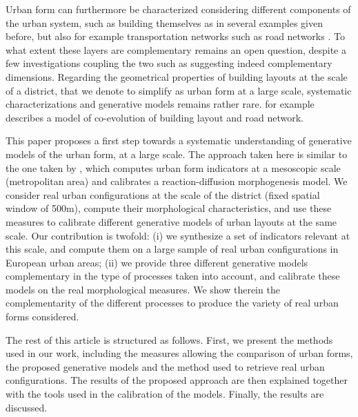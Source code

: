 \documentclass[letterpaper]{article}
\begin{document}


Urban form can furthermore be characterized considering different components of the urban system, such as building themselves as in several examples given before, but also for example transportation networks such as road networks \citep{ye2014quantitative}. To what extent these layers are complementary remains an open question, despite a few investigations coupling the two such as \cite{raimbault2018urban} suggesting indeed complementary dimensions. Regarding the geometrical properties of building layouts at the scale of a district, that we denote to simplify as urban form at a large scale, systematic characterizations and generative models remains rather rare. \cite{achibet2014model} for example describes a model of co-evolution of building layout and road network.



This paper proposes a first step towards a systematic understanding of generative models of the urban form, at a large scale.
The approach taken here is similar to the one taken by \cite{raimbault2018calibration}, which computes urban form indicators at a mesoscopic scale (metropolitan area) and calibrates a reaction-diffusion morphogenesis model.
We consider real urban configurations at the scale of the district (fixed spatial window of 500m), compute their morphological characteristics, and use these measures to calibrate different generative models of urban layouts at the same scale.
Our contribution is twofold: (i) we synthesize a set of indicators relevant at this scale, and compute them on a large sample of real urban configurations in European urban areas; (ii) we provide three different generative models complementary in the type of processes taken into account, and calibrate these models on the real morphological measures. We show therein the complementarity of the different processes to produce the variety of real urban forms considered.

The rest of this article is structured as follows.
First, we present the methods used in our work, including the measures allowing the comparison of urban forms, the proposed generative models and the method used to retrieve real urban configurations.
The results of the proposed approach are then explained together with the tools used in the calibration of the models.
Finally, the results are discussed.
\end{document}
